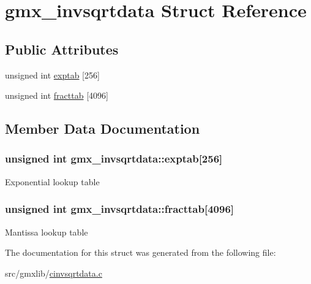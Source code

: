 \hypertarget{structgmx__invsqrtdata}{\section{gmx\-\_\-invsqrtdata \-Struct \-Reference}
\label{structgmx__invsqrtdata}
}
\subsection*{\-Public \-Attributes}
\begin{DoxyCompactItemize}
\item 
unsigned int \hyperlink{structgmx__invsqrtdata_a8a26613bae5a2b2cf133030ebf20b08b}{exptab} \mbox{[}256\mbox{]}
\item 
unsigned int \hyperlink{structgmx__invsqrtdata_a34011eb5d07514176e0e1361d7810b54}{fracttab} \mbox{[}4096\mbox{]}
\end{DoxyCompactItemize}


\subsection{\-Member \-Data \-Documentation}
\hypertarget{structgmx__invsqrtdata_a8a26613bae5a2b2cf133030ebf20b08b}{
\subsubsection[{exptab}]{\setlength{\rightskip}{0pt plus 5cm}unsigned int {\bf gmx\-\_\-invsqrtdata\-::exptab}\mbox{[}256\mbox{]}}}\label{structgmx__invsqrtdata_a8a26613bae5a2b2cf133030ebf20b08b}
\-Exponential lookup table \hypertarget{structgmx__invsqrtdata_a34011eb5d07514176e0e1361d7810b54}{
\subsubsection[{fracttab}]{\setlength{\rightskip}{0pt plus 5cm}unsigned int {\bf gmx\-\_\-invsqrtdata\-::fracttab}\mbox{[}4096\mbox{]}}}\label{structgmx__invsqrtdata_a34011eb5d07514176e0e1361d7810b54}
\-Mantissa lookup table 

\-The documentation for this struct was generated from the following file\-:\begin{DoxyCompactItemize}
\item 
src/gmxlib/\hyperlink{cinvsqrtdata_8c}{cinvsqrtdata.\-c}\end{DoxyCompactItemize}
